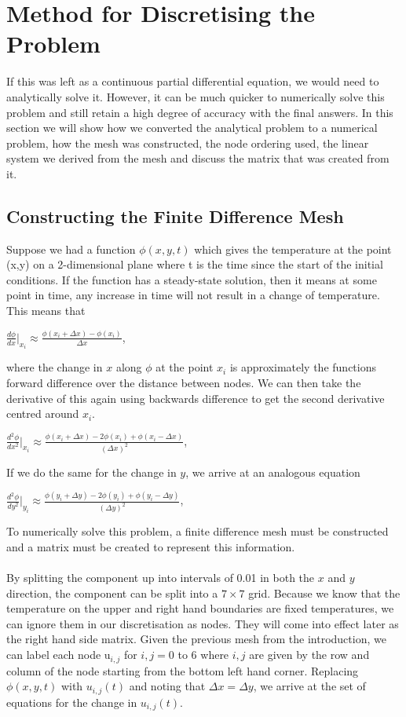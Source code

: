 \documentclass[12pt,a4paper]{article}
\begin{document}
\section{Method for Discretising the Problem}
If this was left as a continuous partial differential equation, we would need to analytically solve it. However, it can be much quicker to numerically solve this problem and still retain a high degree of accuracy with the final answers. In this section we will show how we converted the analytical problem to a numerical problem, how the mesh was constructed, the node ordering used, the linear system we derived from the mesh and discuss the matrix that was created from it.


\subsection{Constructing the Finite Difference Mesh}
Suppose we had a function $\phi(x,y,t)$ which gives the temperature at the point (x,y) on a 2-dimensional plane where t is the time since the start of the initial conditions. If the function has a steady-state solution, then it means at some point in time, any increase in time will not result in a change of temperature. This means that 
\begin{center}
$\frac{d\phi}{dx}|_{x_i}\approx\frac{\phi(x_i+\Delta x)-\phi(x_i)}{\Delta x}$,
\end{center}
where the change in $x$ along $\phi$ at the point $x_i$ is approximately the functions forward difference over the distance between nodes. We can then take the derivative of this again using backwards difference to get the second derivative centred around $x_i$.
\begin{center}
$\frac{d^2\phi}{dx^2}|_{x_i}\approx\frac{\phi(x_i+\Delta x)-2\phi(x_i)+\phi(x_i-\Delta x)}{(\Delta x)^2}$,
\end{center}
If we do the same for the change in $y$, we arrive at an analogous equation
\begin{center}
$\frac{d^2\phi}{dy^2}|_{y_i}\approx\frac{\phi(y_i+\Delta y)-2\phi(y_i)+\phi(y_i-\Delta y)}{(\Delta y)^2}$,
\end{center}
To numerically solve this problem, a finite difference mesh must be constructed and a matrix must be created to represent this information.
\\\\
By splitting the component up into intervals of 0.01 in both the $x$ and $y$ direction, the component can be split into a $7 \times 7$ grid. Because we know that the temperature on the upper and right hand boundaries are fixed temperatures, we can ignore them in our discretisation as nodes. They will come into effect later as the right hand side matrix. Given the previous mesh from the introduction, we can label each node u$_{i,j}$ for $i,j = 0$ to 6 where $i, j$ are given by the row and column of the node starting from the bottom left hand corner. Replacing $\phi(x,y,t)$ with $u_{i,j}(t)$ and noting that $\Delta x = \Delta y$, we arrive at the set of equations for the change in $u_{i,j}(t)$.
\end{document}

